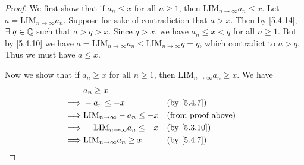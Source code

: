 \begin{proof}
  We first show that if \(a_n \leq x\) for all \(n \geq 1\), then \(\text{LIM}_{n \to \infty} a_n \leq x\).
  Let \(a = \text{LIM}_{n \to \infty} a_n\).
  Suppose for sake of contradiction that \(a > x\).
  Then by \cref{5.4.14}, \(\exists\ q \in \mathbb{Q}\) such that \(a > q > x\).
  Since \(q > x\), we have \(a_n \leq x < q\) for all \(n \geq 1\).
  But by \cref{5.4.10} we have \(a = \text{LIM}_{n \to \infty} a_n \leq \text{LIM}_{n \to \infty} q = q\), which contradict to \(a > q\).
  Thus we must have \(a \leq x\).

  Now we show that if \(a_n \geq x\) for all \(n \geq 1\), then \(\text{LIM}_{n \to \infty} a_n \geq x\).
  We have
  \begin{align*}
             & a_n \geq x                                                            \\
    \implies & -a_n \leq -x                           &  & \text{(by \cref{5.4.7})}  \\
    \implies & \text{LIM}_{n \to \infty} -a_n \leq -x &  & \text{(from proof above)} \\
    \implies & -\text{LIM}_{n \to \infty} a_n \leq -x &  & \text{(by \cref{5.3.10})} \\
    \implies & \text{LIM}_{n \to \infty} a_n \geq x.  &  & \text{(by \cref{5.4.7})}
  \end{align*}
\end{proof}